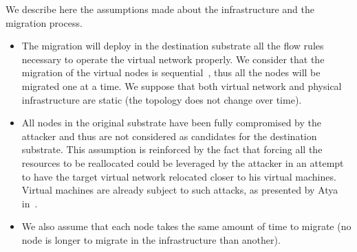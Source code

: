 \label{sec:mdp-system-hypotheses}
We describe here the assumptions made about the infrastructure and the migration process.

\begin{itemize}

    \item
    The migration will deploy in the destination substrate all the flow rules necessary to operate the virtual network properly. We consider that the migration of the virtual nodes is sequential~\cite{Lime-Ghorbani2014}, thus all the nodes will be migrated one at a time.
    We suppose that both virtual network and physical infrastructure are static (\ie the topology does not change over time).
    
    \item All nodes in the original substrate have been fully compromised by the attacker and thus are not considered as candidates for the destination substrate.  
    This assumption is reinforced by the fact that forcing all the resources to be reallocated could be leveraged by the attacker in an attempt to have the target virtual network relocated closer to his virtual machines.
    Virtual machines are already subject to such attacks, as presented by Atya \etal in~\cite{stalling-atya2017,malicious-atya2017}.

    \item
    We also assume that each node takes the same amount of time to migrate (\ie no node is longer to migrate in the infrastructure than another).
\end{itemize}